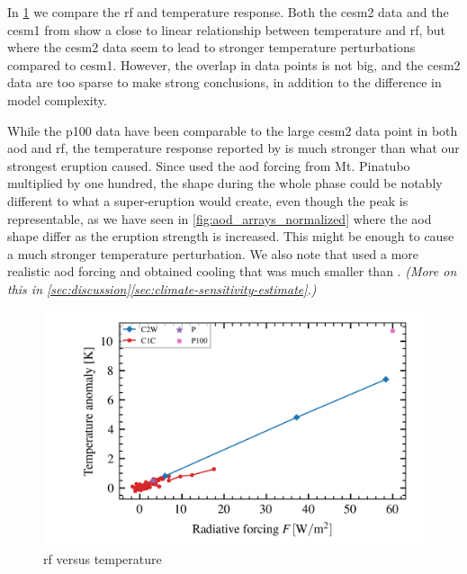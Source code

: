\documentclass{ametsocV5}
\begin{document}
In \cref{fig:toa_vs_temp} we compare the \ac{rf} and temperature response. Both the
\ac{cesm2} data and the \ac{cesm1} from \citet{ottobliesner2016} show a close to linear
relationship between temperature and \ac{rf}, but where the \ac{cesm2} data seem to lead
to stronger temperature perturbations compared to \ac{cesm1}. However, the overlap in
data points is not big, and the \ac{cesm2} data are too sparse to make strong
conclusions, in addition to the difference in model complexity.

While the \ac{p100} data have been comparable to the large \ac{cesm2} data point in both
\ac{aod} and \ac{rf}, the temperature response reported by \citet{jones2005} is much
stronger than what our strongest eruption caused. Since \citet{jones2005} used the
\ac{aod} forcing from Mt. Pinatubo multiplied by one hundred, the shape during the whole
phase could be notably different to what a super-eruption would create, even though the
peak is representable, as we have seen in \cref{fig:aod_arrays_normalized} where the
\ac{aod} shape differ as the eruption strength is increased. This might be enough to
cause a much stronger temperature perturbation. We also note that \citet{timmreck2010}
used a more realistic \ac{aod} forcing and obtained cooling that was much smaller than
\citet{jones2005}. \emph{(More on this in
  \cref{sec:discussion}\ref{sec:climate-sensitivity-estimate}.)}

\begin{figure}[t]
  \begin{center}
    \includegraphics[width=0.95\linewidth]{figures/toa_vs_temperature.png}
  \end{center}
  \caption{\ac{rf} versus temperature}%
  \label{fig:toa_vs_temp}
\end{figure}
\end{document}

